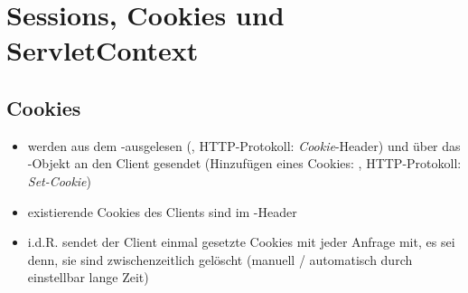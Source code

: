 \section{Sessions, Cookies und ServletContext}

\subsection{Cookies}

\begin{itemize}
    \item werden aus dem -ausgelesen (, HTTP-Protokoll: \textit{Cookie}-Header) und über das -Objekt an den Client gesendet (Hinzufügen eines Cookies: , HTTP-Protokoll: \textit{Set-Cookie})
    \item existierende Cookies des Clients sind im -Header
    \item i.d.R. sendet der Client einmal gesetzte Cookies mit jeder Anfrage mit, es sei denn, sie sind zwischenzeitlich gelöscht (manuell / automatisch durch einstellbar lange Zeit)
\end{itemize}


